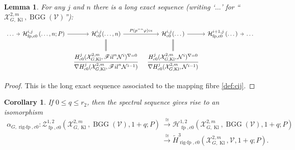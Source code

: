 \documentclass[cjm]{ipart}
\theoremstyle{plain}
\newtheorem{lemma}[theorem]{Lemma}
\newtheorem{corollary}[theorem]{Corollary}
\theoremstyle{remark}
\DeclareMathOperator{\BGG}{BGG}
\DeclareMathOperator{\fp}{fp}
\DeclareMathOperator{\Kl}{Kl}
\DeclareMathOperator{\rigfp}{rig-fp}
\newcommand{\cH}{\mathcal{H}}
\newcommand{\cN}{\mathcal{N}}
\newcommand{\cV}{\mathcal{V}}
\newcommand{\cX}{\mathcal{X}}
\newcommand{\sFil}{{\mathscr Fil}}
\newcommand{\wH}{\widetilde{H}}
\numberwithin{equation}{subsection}
\renewcommand{\leq}{\leqslant}
\begin{document}
   \begin{lemma}\label{lem:fpsurjontokerP}
    For any $j$ and $n$ there is a long exact sequence (writing `$\dots$' for ``$\cX_{G,\Kl}^{2,m},\BGG(\cV)$''):
    \[
     \begin{tikzcd}[column sep=tiny]
     \dots
       \arrow[r]
     &
     \cH^{i,j}_{\fp,c0}\left(\dots, n;P\right)
       \arrow[r]
     &
     \cH^{i,j}_{c0}(\dots, n)
       \arrow[r, "P(p^{-n}\varphi)\circ \iota"]
       \arrow[d, equal]
     &
     \cH^{i,j}_{c0}(\dots)
       \arrow[r]
       \arrow[d, equal]
     &
     \cH^{i+1,j}_{\fp,c0}\left(\dots\right)
       \arrow[r]
     &
     \dots
     \\
     &&
     \dfrac{H^j_{c0}(\cX_{G,\Kl}^{2,m}, \sFil^n \cN^i)^{\nabla=0}}
          {\nabla H^j_{c0}(\cX_{G,\Kl}^{2,m}, \sFil^n \cN^{i-1})}
     &
     \dfrac{H^j_{c0}(\cX_{G,\Kl}^{2,m}, \cN^i)^{\nabla=0}}
          {\nabla H^j_{c0}(\cX_{G,\Kl}^{2,m}, \cN^{i-1})}
     \end{tikzcd}
    \]
   \end{lemma}

   \begin{proof}
    This is the long exact sequence associated to the mapping fibre \eqref{def:cij}.
   \end{proof}


   \begin{corollary}
    \label{cor:fppairmapsS}
    If $0\leq q\leq r_2$, then the spectral sequence gives rise to an isomorphism
    \begin{align*}
     \alpha_{G, \rigfp, c0}: \mathscr{Z}^{1, 2}_{\fp,c0}(\cX_{G,\Kl}^{2,m}, \BGG(\cV),1+q; P)
     & \xrightarrow{\,\cong\,} \cH^{1, 2}_{\fp,c0}(\cX_{G,\Kl}^{2,m}, \BGG(\cV),1+q;P)\\
     & \xrightarrow{\,\cong\,} \wH^{3}_{\rigfp, c0}(\cX_{G,\Kl}^{2,m}, \cV,1+q; P).
    \end{align*}
   \end{corollary}
\end{document}

